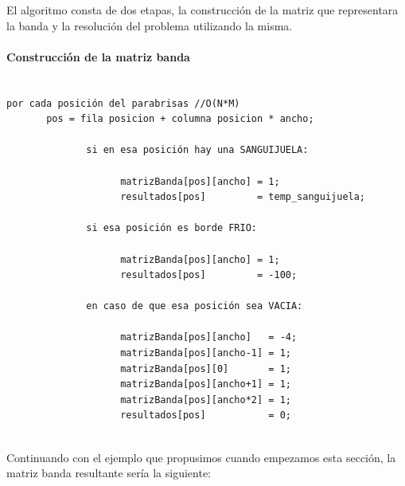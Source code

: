 El algoritmo consta de dos etapas, la construcción de la matriz que representara la banda y la resolución del problema utilizando la misma.

\paragraph{Construcción de la matriz banda}
\begin{verbatim}

por cada posición del parabrisas //O(N*M)
       pos = fila posicion + columna posicion * ancho;
		
              si en esa posición hay una SANGUIJUELA:
			
                    matrizBanda[pos][ancho] = 1;
                    resultados[pos]         = temp_sanguijuela;
		
              si esa posición es borde FRIO:
                    
                    matrizBanda[pos][ancho] = 1;
                    resultados[pos]         = -100;

              en caso de que esa posición sea VACIA:
                    
                    matrizBanda[pos][ancho]   = -4;
                    matrizBanda[pos][ancho-1] = 1;
                    matrizBanda[pos][0]       = 1;
                    matrizBanda[pos][ancho+1] = 1;
                    matrizBanda[pos][ancho*2] = 1;
                    resultados[pos]           = 0; 
		

\end{verbatim}

Continuando con el ejemplo que propusimos cuando empezamos esta sección, la matriz banda resultante sería la siguiente:

